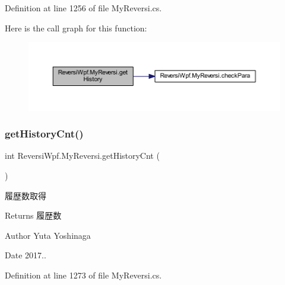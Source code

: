 Definition at line 1256 of file My\+Reversi.\+cs.

Here is the call graph for this function\+:\nopagebreak
\begin{figure}[H]
\begin{center}
\leavevmode
\includegraphics[width=350pt]{class_reversi_wpf_1_1_my_reversi_aa85fcb151ab7c188b0637b9eb9269baa_cgraph}
\end{center}
\end{figure}
\mbox{\label{class_reversi_wpf_1_1_my_reversi_a9e6ba44101405de13825f3585fda00af}} 
\subsubsection{\texorpdfstring{get\+History\+Cnt()}{getHistoryCnt()}}
{\footnotesize\ttfamily int Reversi\+Wpf.\+My\+Reversi.\+get\+History\+Cnt (\begin{DoxyParamCaption}{ }\end{DoxyParamCaption})}



履歴数取得 

\begin{DoxyReturn}{Returns}
履歴数 
\end{DoxyReturn}
\begin{DoxyAuthor}{Author}
Yuta Yoshinaga 
\end{DoxyAuthor}
\begin{DoxyDate}{Date}
2017.. 
\end{DoxyDate}


Definition at line 1273 of file My\+Reversi.\+cs.

\mbox{\label{class_reversi_wpf_1_1_my_reversi_a34b0c0b96b147a8d2f1dc6863cac25d8}} 
